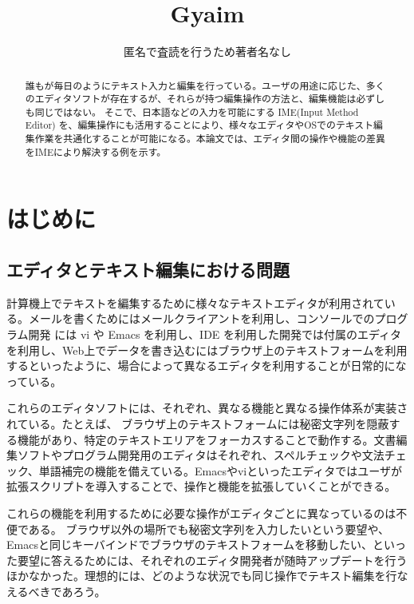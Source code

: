 \documentclass[twoside]{wiss}
\begin{document}
\title{Gyaim}
\etitle{}%
%
%
%
\author{匿名で査読を行うため著者名なし
	}

\begin{abstract}
誰もが毎日のようにテキスト入力と編集を行っている。ユーザの用途に応じた、多くのエディタソフトが存在するが、それらが持つ編集操作の方法と、編集機能は必ずしも同じではない。
そこで、日本語などの入力を可能にする IME(Input Method Editor) を、編集操作にも活用することにより、様々なエディタやOSでのテキスト編集作業を共通化することが可能になる。本論文では、エディタ間の操作や機能の差異をIMEにより解決する例を示す。
\end{abstract}

\maketitle

\section{はじめに}

\subsection{エディタとテキスト編集における問題}

計算機上でテキストを編集するために様々なテキストエディタが利用されている。メールを書くためにはメールクライアントを利用し、コンソールでのプログラム開発 には vi や Emacs を利用し、IDE を利用した開発では付属のエディタを利用し、Web上でデータを書き込むにはブラウザ上のテキストフォームを利用するといったように、場合によって異なるエディタを利用することが日常的になっている。

これらのエディタソフトには、それぞれ、異なる機能と異なる操作体系が実装されている。たとえば、 ブラウザ上のテキストフォームには秘密文字列を隠蔽する機能があり、特定のテキストエリアをフォーカスすることで動作する。文書編集ソフトやプログラム開発用のエディタはそれぞれ、スペルチェックや文法チェック、単語補完の機能を備えている。Emacsやviといったエディタではユーザが拡張スクリプトを導入することで、操作と機能を拡張していくことができる。

これらの機能を利用するために必要な操作がエディタごとに異なっているのは不便である。 ブラウザ以外の場所でも秘密文字列を入力したいという要望や、Emacsと同じキーバインドでブラウザのテキストフォームを移動したい、といった要望に答えるためには、それぞれのエディタ開発者が随時アップデートを行うほかなかった。理想的には、どのような状況でも同じ操作でテキスト編集を行なえるべきであろう。
\end{document}
